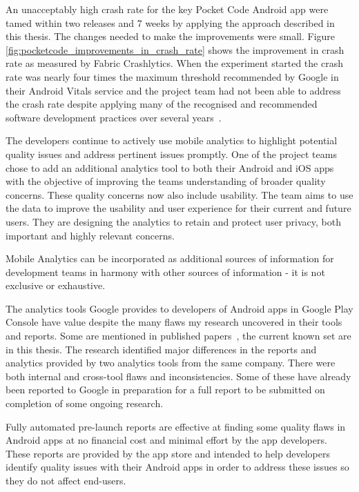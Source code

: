 An unacceptably high crash rate for the key Pocket Code Android app were tamed within two releases and 7 weeks by applying the approach described in this thesis. The changes needed to make the improvements were small. Figure \ref{fig:pocketcode_improvements_in_crash_rate} shows the improvement in crash rate as measured by Fabric Crashlytics. When the experiment started the crash rate was nearly four times the maximum threshold recommended by Google in their Android Vitals service and the project team had not been able to address the crash rate despite applying many of the recognised and recommended software development practices over several years~\cite{adamsen2015systematic_catrobat, luhana2018streamlining, ali2019behavior_catrobat, ali2019using_catrobat, hirsch2019approach_catrobat, schranz2019contributors_catrobat, slany2014tinkering}.

The developers continue to actively use mobile analytics to highlight potential quality issues and address pertinent issues promptly. One of the project teams chose to add an additional analytics tool to both their Android and iOS apps with the objective of improving the teams understanding of broader quality concerns. These quality concerns now also include usability. The team aims to use the data to improve the usability and user experience for their current and future users. They are designing the analytics to retain and protect user privacy, both important and highly relevant concerns.

Mobile Analytics can be incorporated as additional sources of information for development teams in harmony with other sources of information - it is not exclusive or exhaustive.

The analytics tools Google provides to developers of Android apps in Google Play Console have value despite the many flaws my research uncovered in their tools and reports. Some are mentioned in published papers~\cite{harty_google_play_console_insightful_development_using_android_vitals_and_pre_launch_reports, harty_better_android_apps_using_android_vitals, harty_improving_app_quality_despite_flawed_mobile_analytics}, the current known set are in this thesis. The research identified major differences in the reports and analytics provided by two analytics tools from the same company. There were both internal and cross-tool flaws and inconsistencies. Some of these have already been reported to Google in preparation for a full report to be submitted on completion of some ongoing research.

Fully automated pre-launch reports are effective at finding some quality flaws in Android apps at no financial cost and minimal effort by the app developers. These reports are provided by the app store and intended to help developers identify quality issues with their Android apps in order to address these issues so they do not affect end-users.


